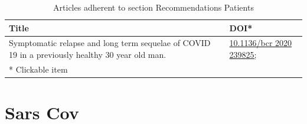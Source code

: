 \documentclass{qqtarticle}
\begin{document}
        \begin{table}[H]
        \scriptsize
        \centering
        \caption{Articles adherent to section Recommendations Patients}
        \renewcommand{\arraystretch}{1.5}
        \begin{tabular}{p{}l}
            \toprule 
            Title & DOI* \\     \midrule Symptomatic relapse and long term sequelae of COVID 19 in a previously healthy 30 year old man. \cite{Symptomati7b5ae66e} & \href{https://dx.doi.org/10.1136/bcr 2020 239825; }{10.1136/bcr 2020 239825; }\\     \midrule
            * Clickable item \\
            \bottomrule
        \end{tabular}
        \label{tab:topic10}
        \end{table}\section{Sars Cov}
\end{document}
